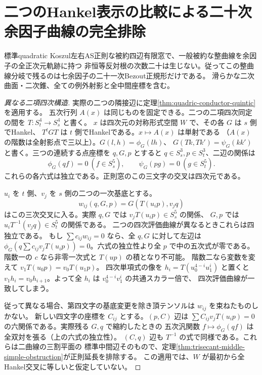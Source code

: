 \section{二つのHankel表示の比較による二十次余因子曲線の完全排除}
\label{sec:degree-twenty-hankel-pairs}
\begin{theorem}\label{thm:exclude-degree-twenty-hankel-pairs}
標準quadratic Koszul左右AS正則な被約四辺有限窓で、一般被約な整曲線を余因子の全正次元軌跡に持つ
非恒等反対根の次数二十は生じない。従ってこの整曲線分岐で残るのは七余因子の二十一次Bezout正規形だけである。
滑らかな二次曲面・二次錐、全ての例外射影と全中間座標を含む。
\end{theorem}
\begin{proof}[異なる二項四次構造]
実際の二つの隣接辺に定理\ref{thm:quadric-conductor-quintic}を適用する。
五次行列 $A(x)$ は同じものを固定できる。二つの二項四次同定の間を $T:S_t^4\to S_s^4$ と書く。
$x$ は四次元の対称形式空間 $W$ で、その各 $G$ は $s$ 側でHankel、
$T^t G T$ は $t$ 側でHankelである。$x\mapsto A(x)$ は単射である
（$A(x)$ の階数は全射影点で三以上）。$G(l,h)=\phi_G(lh)$、
$G(Tk,Tk')=\psi_G(kk')$ と書く。三つの連続する点座標を $q,G,p$ とすると
$q\in S_s^3,p\in S_t^3$、二辺の関係は
\[
          \phi_G(q f)=0\ (f\in S_s^5),\qquad
          \psi_G(p g)=0\ (g\in S_t^5).
\]
これらの各六式は独立である。正則窓のこの三文字の交叉は四次元である。

$u_i$ を $t$ 側、$v_j$ を $s$ 側の二つの一次基底とする。
\[
                  w_{ij}(q,G,p)=G(T(u_i p),v_j q)
\]
はこの三次交叉に入る。実際 $q,G$ では $v_jT(u_i p)\in S_s^5$ の関係、
$G,p$ では $u_iT^{-1}(v_jq)\in S_t^5$ の関係である。
二つの四次評価曲線が異なるときこれらは四独立である。
もし $\sum c_{ij}w_{ij}=0$ なら、全 $q,G$ に対して左辺は
$\phi_G(q\sum c_{ij}v_j T(u_i p))=0$。六式の独立性より全 $p$ で中の五次式が零である。
階数一の $c$ なら非零一次式と $T(u p)$ の積となり不可能。
階数二なら変数を変えて $v_1 T(u_0p)=v_0 T(u_1p)$。
四次単項式の像を $h_i=T(u_0^{4-i}u_1^i)$ と置くと
$v_1 h_i=v_0 h_{i+1}$。よって全 $h_i$ は $v_0^{4-i}v_1^i$ の共通スカラー倍で、
四次評価曲線が一致してしまう。

従って異なる場合、第四文字の基底変更を除き頂テンソルは $w_{ij}$ を束ねたものしかない。
新しい四文字の座標を $C_{ij}$ とする。$(p,C)$ 辺は
$\sum C_{ij}v_jT(u_i p)=0$ の六関係である。実際残る $G,q$ で縮約したときの
五次汎関数 $f\mapsto\phi_G(qf)$ は全双対を張る（上の六式の独立性）。
$(C,q)$ 辺も $T^{-1}$ の式で同様である。これらは二曲線の三割平面の
標準中間辺そのもので、定理\ref{thm:trisecant-middle-simple-obstruction}が正則延長を排除する。
この適用では、$W$ が最初から全Hankel交叉に等しいと仮定していない。
\end{proof}

